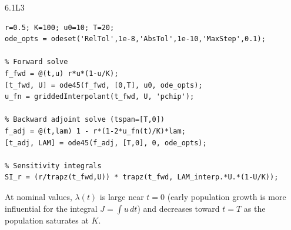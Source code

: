 \begin{solution}{6.1}{L3}
\begin{verbatim}
r=0.5; K=100; u0=10; T=20;
ode_opts = odeset('RelTol',1e-8,'AbsTol',1e-10,'MaxStep',0.1);

% Forward solve
f_fwd = @(t,u) r*u*(1-u/K);
[t_fwd, U] = ode45(f_fwd, [0,T], u0, ode_opts);
u_fn = griddedInterpolant(t_fwd, U, 'pchip');

% Backward adjoint solve (tspan=[T,0])
f_adj = @(t,lam) 1 - r*(1-2*u_fn(t)/K)*lam;
[t_adj, LAM] = ode45(f_adj, [T,0], 0, ode_opts);

% Sensitivity integrals
SI_r = (r/trapz(t_fwd,U)) * trapz(t_fwd, LAM_interp.*U.*(1-U/K));
\end{verbatim}

At nominal values, $\lambda(t)$ is large near $t = 0$ (early population
growth is more influential for the integral $J = \int u\,dt$) and
decreases toward $t = T$ as the population saturates at $K$.


\end{solution}

